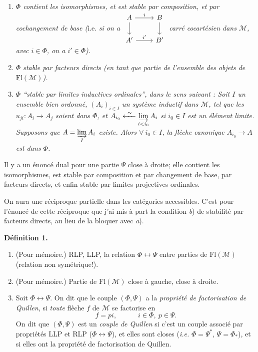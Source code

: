 \documentclass[11pt]{article}
\newcommand{\msp}[1]{\marginpar{\footnotesize [#1]}}
\newcommand{\Fl}{\mathrm{Fl}}
\newcommand{\M}{\mathcal{M}}
\begin{document}
\begin{enumerate}[label={}]
\item[a)] \textit{$\Phi$ contient les isomorphismes, et est stable par composition, et par cochangement de base (}i.e. \textit{si on a}
$\vcenter{\hbox{\begin{tikzcd}
A \arrow[r, "i"] \arrow[d] & B \arrow[d] \\
A' \arrow[r, "i'"] & B'
\end{tikzcd}}}$
\textit{carré cocartésien dans $\M$, avec $i \in \Phi$, on a $i' \in \Phi$).}

\item[b)] \textit{$\Phi$ stable par facteurs directs (en tant que partie de l'ensemble des objets de} $\underline{\Fl}(\M)$\textit{).}

\item[c)] \textit{$\Phi$ ``stable par limites inductives ordinales'', dans le sens suivant : Soit $I$ un ensemble bien ordonné, $(A_i)_{i \in I}$ un système inductif dans $\M$, tel que les $u_{ji} : A_i \longrightarrow A_j$ soient dans $\Phi$, et $A_{i_0} \xleftarrow{\ \sim\ } \varinjlim\limits_{i<i_0} A_i$ si $i_0 \in I$ est un élément limite. Supposons que $A = \varinjlim\limits_{I} A_i$ existe. Alors $\forall\ i_0 \in I$, la flèche canonique $A_{i_0} \longrightarrow A$ est dans $\Phi$.}
\end{enumerate}

Il y a un énoncé dual pour une partie $\Psi$ close à droite; elle contient les isomorphismes, est stable par composition et par changement de base, par facteurs directs, et enfin stable par limites projectives ordinales.

\msp{page 5}

On aura une réciproque partielle dans les catégories accessibles. C'est pour l'énoncé de cette réciproque que j'ai mis à part la condition \textit{b}) de stabilité par facteurs directs, au lieu de la bloquer avec \textit{a}).

\noindent\textbf{Définition 1.}

\begin{enumerate}[label={}]
\item[\textit{a})] (Pour mémoire.) RLP, LLP, la relation $\Phi \longleftrightarrow \Psi$ entre parties de $\Fl(\M)$ (relation non symétrique!).

\item[\textit{b})] (Pour mémoire.) Partie de $\Fl(\M)$ close à gauche, close à droite.

\item[\textit{c})] Soit $\Phi \longleftrightarrow \Psi$. On dit que le couple $(\Phi, \Psi)$ a la \textit{propriété de factorisation de Quillen}, si \textit{toute} flèche $f$ de $\M$ se factorise en
\[
f = pi, \qquad\quad i \in \Phi,\ p \in \Psi.
\]
On dit que $(\Phi, \Psi)$ est un \textit{couple de Quillen} si c'est un couple associé par propriétés LLP et RLP ($\Phi \longleftrightarrow \Psi$), et elles sont closes (\textit{i.e.} $\Phi = \Psi^*$, $\Psi = \Phi_*$), et si elles ont la propriété de factorisation de Quillen.
\end{enumerate}
\end{document}
